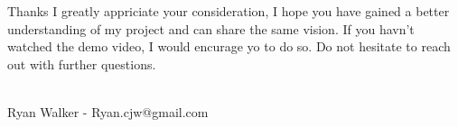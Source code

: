 \documentclass[final, ngerman, xcolor=pdftex, dvipsnames, table, aspectratio=169, 14pt]{beamer}
\begin{document}
\begin{frame}{Thanks}
I greatly appriciate your consideration, I hope you have gained a better understanding of my project and can share the same vision. If you havn't watched the demo video, I would encurage yo to do so. Do not hesitate to reach out with further questions.
\\~\\
\begin{center}
Ryan Walker - Ryan.cjw@gmail.com
\end{center}
\end{frame}
\end{document}
